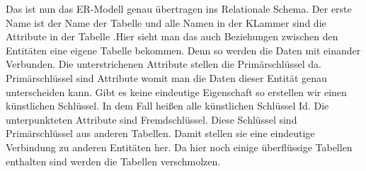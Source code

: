 \documentclass[a4paper,12pt]{article}
\begin{document}
	Das ist nun das ER-Modell genau übertragen ins Relationale Schema. Der erste Name ist der Name der Tabelle und alle Namen in der KLammer sind die Attribute in der Tabelle .Hier sieht man das auch Beziehungen zwischen den Entitäten eine eigene Tabelle bekommen. Denn so werden die Daten mit einander Verbunden. Die unterstrichenen Attribute stellen die Primärschlüssel da. Primärschlüssel sind Attribute womit man die Daten dieser Entität genau unterscheiden kann. Gibt es keine eindeutige Eigenschaft so erstellen wir einen künstlichen Schlüssel. In dem Fall heißen alle künstlichen Schlüssel Id. Die unterpunkteten Attribute sind Fremdschlüssel. Diese Schlüssel sind Primärschlüssel aus anderen Tabellen. Damit stellen sie eine eindeutige Verbindung zu anderen Entitäten her. Da hier noch einige überflüssige Tabellen enthalten sind werden die Tabellen verschmolzen.
\end{document}
